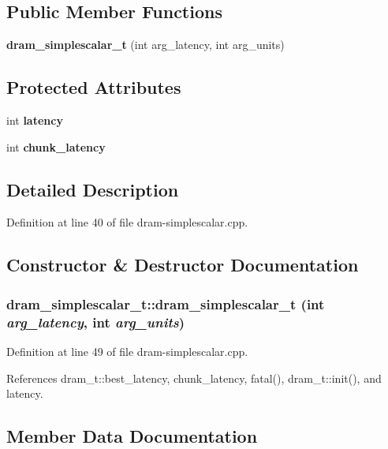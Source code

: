 \subsection*{Public Member Functions}
\begin{CompactItemize}
\item 
{\bf dram\_\-simplescalar\_\-t} (int arg\_\-latency, int arg\_\-units)
\end{CompactItemize}
\subsection*{Protected Attributes}
\begin{CompactItemize}
\item 
int {\bf latency}
\item 
int {\bf chunk\_\-latency}
\end{CompactItemize}


\subsection{Detailed Description}


Definition at line 40 of file dram-simplescalar.cpp.

\subsection{Constructor \& Destructor Documentation}
\subsubsection[{dram\_\-simplescalar\_\-t}]{\setlength{\rightskip}{0pt plus 5cm}dram\_\-simplescalar\_\-t::dram\_\-simplescalar\_\-t (int {\em arg\_\-latency}, \/  int {\em arg\_\-units})\hspace{0.3cm}{\tt  [inline]}}\label{classdram__simplescalar__t_4c4ce8bb898ecac98ba4f9b8a05a64ed}




Definition at line 49 of file dram-simplescalar.cpp.

References dram\_\-t::best\_\-latency, chunk\_\-latency, fatal(), dram\_\-t::init(), and latency.

\subsection{Member Data Documentation}
